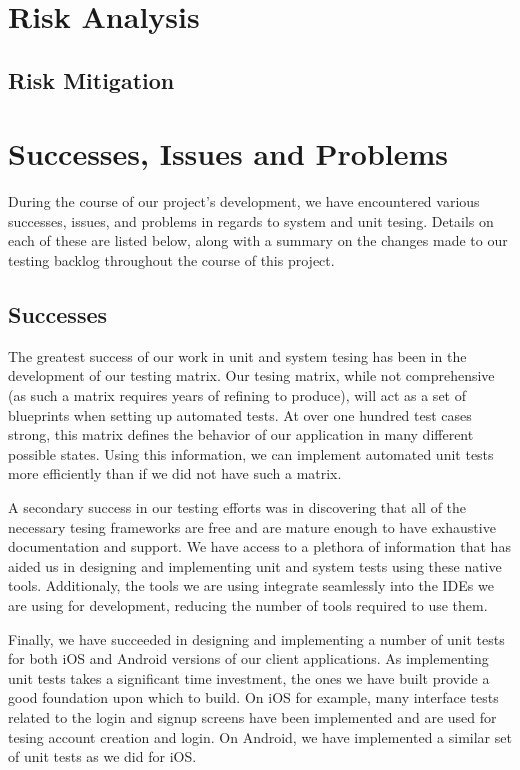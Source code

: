 \section{Risk Analysis}

\subsection{Risk Mitigation}

\section{Successes, Issues and Problems}

During the course of our project's development, we have encountered various
successes, issues, and problems in regards to system and unit tesing. Details on
each of these are listed below, along with a summary on the changes made to our
testing backlog throughout the course of this project.


\subsection{Successes}

The greatest success of our work in unit and system tesing has been in the
development of our testing matrix. Our tesing matrix, while not comprehensive
(as such a matrix requires years of refining to produce), will act as a set of
blueprints when setting up automated tests. At over one hundred test cases
strong, this matrix defines the behavior of our application in many different
possible states. Using this information, we can implement automated unit tests
more efficiently than if we did not have such a matrix.

A secondary success in our testing efforts was in discovering that all of the
necessary tesing frameworks are free and are mature enough to have exhaustive
documentation and support. We have access to a plethora of information that has
aided us in designing and implementing unit and system tests using these native
tools. Additionaly, the tools we are using integrate seamlessly into the IDEs we
are using for development, reducing the number of tools required to use them.

Finally, we have succeeded in designing and implementing a number of unit tests
for both iOS and Android versions of our client applications. As implementing
unit tests takes a significant time investment, the ones we have built provide a
good foundation upon which to build. On iOS for example, many interface tests
related to the login and signup screens have been implemented and are used for
tesing account creation and login. On Android, we have implemented a similar set
of unit tests as we did for iOS.


